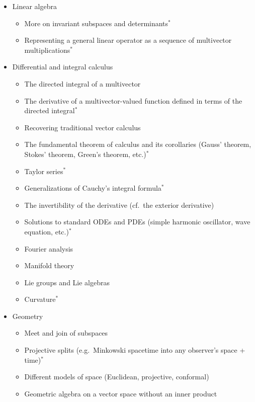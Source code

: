 \documentclass{utarticle}
\begin{document}
\begin{itemize}
\item Linear algebra
         \begin{itemize}
         \item More on invariant subspaces and determinants$^*$
         \item Representing a general linear operator as a sequence of multivector multiplications$^*$
         \end{itemize}
\item Differential and integral calculus
          \begin{itemize}
          \item The directed integral of a multivector
          \item The derivative of a multivector-valued function defined in terms of the directed integral$^*$
          \item Recovering traditional vector calculus
          \item The fundamental theorem of calculus and its corollaries (Gauss' theorem, Stokes' theorem, Green's theorem, etc.)$^*$
          \item Taylor series$^*$
          \item Generalizations of Cauchy's integral formula$^*$
          \item The invertibility of the derivative (cf.\ the exterior derivative)
          \item Solutions to standard ODEs and PDEs (simple harmonic oscillator, wave equation, etc.)$^*$
          \item Fourier analysis
          \item Manifold theory
          \item Lie groups and Lie algebras
          \item Curvature$^*$
          \end{itemize}
\item Geometry
          \begin{itemize}
          \item Meet and join of subspaces
          \item Projective splits (e.g.\ Minkowski spacetime into any observer's space + time)$^*$
          \item Different models of space (Euclidean, projective, conformal)
          \item Geometric algebra on a vector space without an inner product
          \end{itemize}

\end{itemize}
\end{document}
